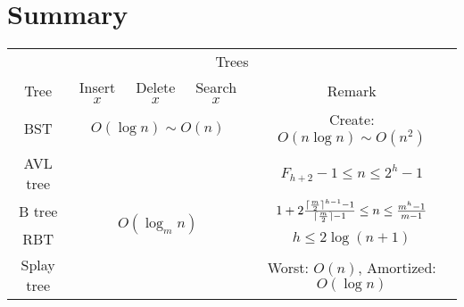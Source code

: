 \section{Summary}

\begin{table}[H]
    \centering
    \begin{tabular}{|c|c|c|c|c|}
        \hline
        \multicolumn{5}{|c|}{Trees} \\
        \Xhline{3\arrayrulewidth}
        Tree & Insert $x$ & Delete $x$ & Search $x$ & Remark \\
        \Xhline{2\arrayrulewidth}
        BST & \multicolumn{3}{c|}{$O(\log n) \sim O(n)$} & Create: $O(n\log n) \sim O(n^2)$ \\
        \hline
        AVL tree & \multicolumn{3}{c|}{\multirow{4}{*}{$O(\log_m n)$}} & $F_{h + 2} - 1 \le n \le 2^h - 1$ \\
        \cline{1-1}\cline{5-5}
        B tree & \multicolumn{3}{c|}{} & $1 + 2\frac{\lceil\frac{m}{2}\rceil^{h - 1} - 1}{\lceil\frac{m}{2}\rceil - 1} \le n \le \frac{m^h - 1}{m - 1}$ \\
        \cline{1-1}\cline{5-5}
        RBT & \multicolumn{3}{c|}{} & $h \le 2\log (n + 1)$ \\
        \cline{1-1}\cline{5-5}
        Splay tree & \multicolumn{3}{c|}{} & Worst: $O(n)$, Amortized: $O(\log n)$ \\
        \hline
    \end{tabular}
\end{table}

